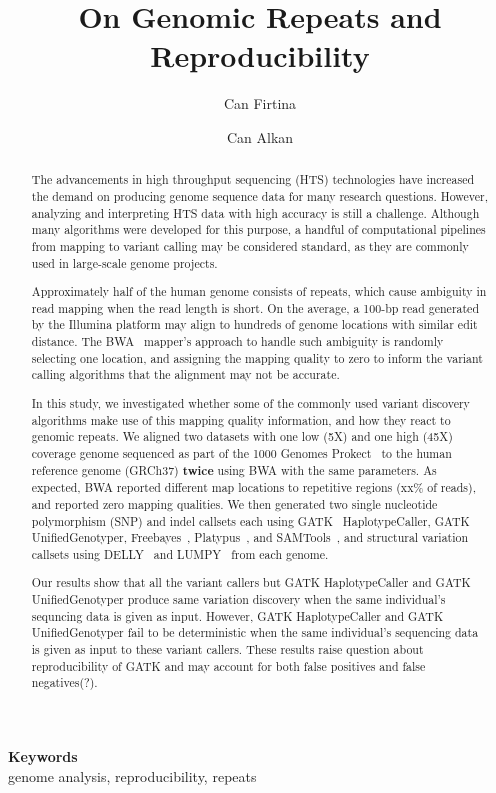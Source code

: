 \documentclass[a4paper]{article}
\date{}
\def\keywords#1{\begin{center}{\bf Keywords}\\{#1}\end{center}}
\def\titulo#1{\title{#1}}
\begin{document}
\titulo{On Genomic Repeats and Reproducibility}

\author[1]{Can Firtina}
\author[1]{Can Alkan}

\maketitle
\thispagestyle{empty}


\begin{abstract}
The advancements in high throughput sequencing (HTS) technologies have increased the demand on producing  genome sequence data for many research questions. However, analyzing and interpreting HTS data with high accuracy is still a challenge. 
Although many algorithms were developed for this purpose, a handful of computational pipelines from mapping to variant calling may be considered standard, as they are commonly used in large-scale genome projects.

Approximately half of the human genome consists of repeats, which cause ambiguity in read mapping when the read length is short. On the average, a 100-bp read generated by the Illumina platform may align to hundreds of genome locations with similar edit distance. 
The BWA~\cite{Li2009a} mapper's  approach to handle such ambiguity is randomly selecting one location, and assigning the mapping quality to zero to inform the variant calling algorithms that the alignment may not be accurate. 

In this study, we investigated whether some of the commonly used variant discovery algorithms
make use of this mapping quality information, and how they react to genomic repeats.
We aligned two datasets with one low (5X) and one high (45X) coverage genome
sequenced as part of the 1000 Genomes Prokect~\cite{1000GP2012} to the human reference genome (GRCh37) {\bf twice} using BWA with the same parameters. As expected, BWA reported different map locations to repetitive regions (xx\% of reads), and reported zero mapping qualities. We then generated two single nucleotide polymorphism (SNP) and indel callsets each using GATK~\cite{DePristo2011} HaplotypeCaller, GATK UnifiedGenotyper, Freebayes~\cite{Garrison2012}, Platypus~\cite{Rimmer2014}, and SAMTools~\cite{Li2009b}, and structural variation
callsets using DELLY~\cite{Rausch2012} and LUMPY~\cite{Layer2014} from each genome.


Our results show that all the variant callers but GATK HaplotypeCaller and GATK UnifiedGenotyper produce same variation discovery when the same individual's sequncing data is given as input. However, GATK HaplotypeCaller and GATK UnifiedGenotyper fail to be deterministic when the same individual's sequencing data is given as input to these variant callers. These results raise question about reproducibility of GATK and may account for both false positives and false negatives(?).
\end{abstract}

\keywords{genome analysis, reproducibility, repeats}

\scriptsize

\vspace*{-0.2cm}

\end{document}
